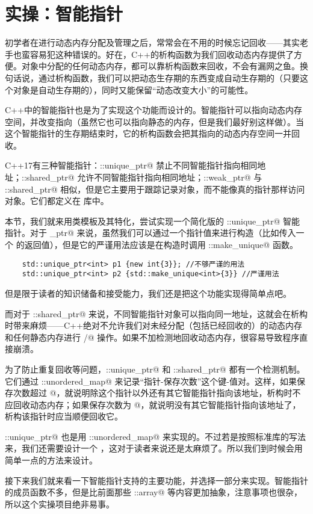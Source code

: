 \section{实操：智能指针}
初学者在进行动态内存分配及管理之后，常常会在不用的时候忘记回收——其实老手也蛮容易犯这种错误的。好在，C++的析构函数为我们回收动态内存提供了方便。对象中分配的任何动态内存，都可以靠析构函数来回收，不会有漏网之鱼。换句话说，通过析构函数，我们可以把动态生存期的东西变成自动生存期的（只要这个对象是自动生存期的），同时又能保留``动态改变大小''的可能性。\par
C++中的智能指针也是为了实现这个功能而设计的。智能指针可以指向动态内存空间，并改变指向（虽然它也可以指向静态的内存，但是我们最好别这样做）。当这个智能指针的生存期结束时，它的析构函数会把其指向的动态内存空间一并回收。\par
C++17有三种智能指针：\lstinline@std::unique_ptr@ 禁止不同智能指针指向相同地址；\lstinline@std::shared_ptr@ 允许不同智能指针指向相同地址；\lstinline@std::weak_ptr@ 与 \lstinline@std::shared_ptr@ 相似，但是它主要用于跟踪记录对象，而不能像真的指针那样访问对象。它们都定义在 \lstinline@memory@ 库中。\par
本节，我们就来用类模板及其特化，尝试实现一个简化版的 \lstinline@std::unique_ptr@ 智能指针。对于 \lstinline@unique_ptr@ 来说，虽然我们可以通过一个指针值来进行构造（比如传入一个 \lstinline@new@ 的返回值），但是它的严谨用法应该是在构造时调用 \lstinline@std::make_unique@ 函数。
\begin{lstlisting}
    std::unique_ptr<int> p1 {new int{3}}; //不够严谨的用法
    std::unique_ptr<int> p2 {std::make_unique<int>{3}} //严谨用法
\end{lstlisting}
但是限于读者的知识储备和接受能力，我们还是把这个功能实现得简单点吧。\par
而对于 \lstinline@std::shared_ptr@ 来说，不同智能指针对象可以指向同一地址，这就会在析构时带来麻烦——C++绝对不允许我们对未经分配（包括已经回收的）的动态内存和任何静态内存进行 \lstinline@delete@/\linebreak\lstinline@delete[]@ 操作。如果不加检测地回收动态内存，很容易导致程序直接崩溃。\par
为了防止重复回收等问题，\lstinline@std::unique_ptr@ 和 \lstinline@std::shared_ptr@ 都有一个检测机制。它们通过 \lstinline@std::unordered_map@ 来记录``指针-保存次数''这个键-值对。这样，如果保存次数超过 @，就说明除这个指针以外还有其它智能指针指向该地址，析构时不应回收动态内存；如果保存次数为 @，就说明没有其它智能指针指向该地址了，析构该指针时应当顺便回收它。\par
\lstinline@std::unique_ptr@ 也是用 \lstinline@std::unordered_map@ 来实现的。不过若是按照标准库的写法来，我们还需要设计一个 \lstinline@hash@，这对于读者来说还是太麻烦了。所以我们到时候会用简单一点的方法来设计。\par
接下来我们就来看一下智能指针支持的主要功能，并选择一部分来实现。智能指针的成员函数不多，但是比前面那些 \lstinline@std::array@ 等内容更加抽象，注意事项也很杂，所以这个实操项目绝非易事。\par

